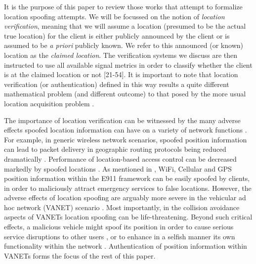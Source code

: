 \documentclass[journal]{IEEEtran}
\begin{document}
 It is the purpose of this paper to review those works that attempt to formalize location spoofing attempts. We will be focussed on the notion of \emph{location verification}, meaning that we will assume a location (presumed to be the actual true location) for the client is either publicly announced by the client or is assumed to be \emph{a priori} publicly known. We refer to this announced (or known) location as the \emph{claimed location}. The verification systems  we discuss are then instructed to use all available signal metrics in order to classify whether the client is at the claimed location or not [21-54]. It is important to note that location verification (or authentication) defined in this way results a quite different mathematical problem (and different outcome) to that posed by the more usual location acquisition problem \cite{hofmann1997global,bulusu2000gps,li2005robust,capkun2006secure,liu2008attack,mahfouz2013distance}.

The importance of location verification can be witnessed by the many adverse effects spoofed location information can have on a variety of network functions \cite{raya2005the,papad2006securing,raya2007securing,papad2008secure,leinmuller2005influence,leinmuller2006greedy,mauve2001survey,yang2008connectivity,rabayah2012new,bertino2005geo,chen2006inverting,capkun2010integrity}.
 For example, in generic wireless  network scenarios, spoofed position information can lead to packet delivery in geographic  routing protocols \cite{mauve2001survey,yang2008connectivity,rabayah2012new} being reduced dramatically  \cite{leinmuller2005influence,leinmuller2006greedy}.  Performance of location-based access control can be decreased markedly by spoofed locations \cite{bertino2005geo,chen2006inverting,capkun2010integrity}. As mentioned in \cite{malaney2006secure}, WiFi, Cellular and  GPS position information within the E911 framework can be easily spoofed by clients,
 in order to maliciously attract emergency services to false locations.
However, the adverse effects of location spoofing are arguably more severe in the vehicular ad hoc network (VANET) scenario \cite{raya2005the,papad2006securing,raya2007securing,papad2008secure}. Most importantly, in the collision avoidance aspects of VANETs location spoofing can be life-threatening. Beyond such critical effects,  a malicious  vehicle might spoof its position  in order to cause serious service disruptions to other users \cite{raya2005the,papad2006securing,raya2007securing}, or to enhance in a selfish manner its own functionality within the network \cite{jaeger2012novel,yu2013detecting}. Authentication of position information within VANETs  forms the focus of the rest of this paper.
\end{document}
